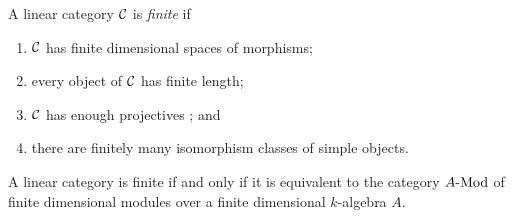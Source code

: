 \documentclass{amsart}
\begin{document}
\begin{definition} %
	A linear category $\mathcal C$ is {\em finite} if 
	\begin{enumerate}
		\item $\mathcal C$ has finite dimensional spaces of morphisms;
		\item every object of $\mathcal C$ has finite length;
		\item $\mathcal C$ has enough projectives%
		; and
		\item there are finitely many isomorphism classes of simple objects.  
	\end{enumerate}
\end{definition}

\begin{proposition}
A linear category is finite if and only if it is equivalent to the category $\Mod{A}{}$ of finite dimensional modules over a finite dimensional $k$-algebra $A$.
\end{proposition}
\end{document}
